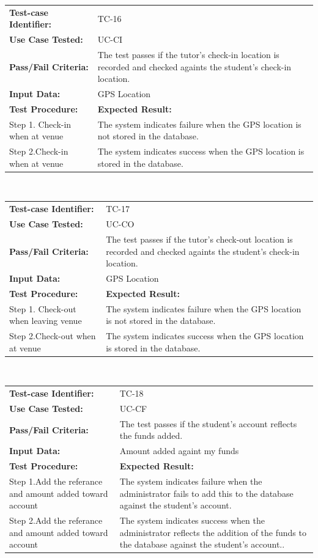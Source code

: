 \documentclass[12pt]{article}
\begin{document}
\begin{tabular}{| p{8cm} | p{8cm} |} \hline
	\textbf{Test-case Identifier:}& TC-16\\
	\textbf{Use Case Tested:}& UC-CI\\
	\textbf{Pass/Fail Criteria:}& The test passes if the tutor's check-in location is recorded and checked againts the student's check-in location.\\
	\textbf{Input Data:}& GPS Location\\\hline
	\textbf{Test Procedure:}& \textbf{Expected Result:} \\\hline
	Step 1. Check-in when at venue & The system indicates failure when the GPS location is not stored in the database. \\
	Step 2.Check-in when at venue & The system indicates success when the GPS location is  stored in the database.\\
		\hline
\end{tabular}
\\

\begin{tabular}{| p{8cm} | p{8cm} |} \hline
	\textbf{Test-case Identifier:}& TC-17\\
	\textbf{Use Case Tested:}& UC-CO\\
	\textbf{Pass/Fail Criteria:}& The test passes if the tutor's check-out location is recorded and checked againts the student's check-in location.\\
	\textbf{Input Data:}& GPS Location\\\hline
	\textbf{Test Procedure:}& \textbf{Expected Result:} \\\hline
	Step 1. Check-out when leaving venue & The system indicates failure when the GPS location is not stored in the database. \\
	Step 2.Check-out when at venue & The system indicates success when the GPS location is stored in the database.\\
		\hline
\end{tabular}
\\

\begin{tabular}{| p{8cm} | p{8cm} |} \hline
	\textbf{Test-case Identifier:}& TC-18\\
	\textbf{Use Case Tested:}& UC-CF\\
	\textbf{Pass/Fail Criteria:}& The test passes if the student's account reflects the funds added.\\
	\textbf{Input Data:}& Amount added againt my funds\\\hline
	\textbf{Test Procedure:}& \textbf{Expected Result:} \\\hline
	Step 1.Add the referance and amount added toward account & The system indicates failure when the administrator fails to add this to the database against the student's account. \\
	Step 2.Add the referance and amount added toward account & The system indicates success when the administrator reflects the addition of the funds  to the database against the student's account..\\
		\hline
\end{tabular}
\\
\end{document}
